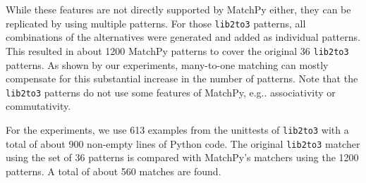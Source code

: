 \documentclass[conference,compsoc]{IEEEtran}
\makeatletter
\DeclareRobustCommand\onedot{\futurelet\@let@token\@onedot}
\def\@onedot{\ifx\@let@token.\else.\null\fi\xspace}
\def\eg{{e.g}\onedot} \def\Eg{{E.g}\onedot}
\newif\ifminted
\makeatother
\begin{document}
\ifminted
The following is an example of such a pattern:
\begin{verbatim}
power< 'isinstance'
    trailer< '(' arglist< any ','
        atom< '('
            args=testlist_gexp< any+ >
')' > > ')' > >
\end{verbatim}

It matches an \texttt{isinstance} expression with a tuple as second argument.
Its tree structure is illustrated in Figure \ref{fig:ast}.
The corresponding fixer cleans up duplications generated by previous fixers.
For example, \texttt{isinstance(x, (int, long))}
would be converted by another fixer into \texttt{isinstance(x, (int, int))}
which in turn is then simplified to \texttt{isinstance(x, int)} by this fixer.
\begin{figure}[]\noindent\makebox[\columnwidth][c]{\texttt{[image: ast.pdf]}}
\caption{AST of the \texttt{isinstance} pattern. \label{fig:ast}}
\end{figure}

Out of the original 46 patterns, 36 could be converted to MatchPy patterns.
Some patterns could not be converted because they contain features that MatchPy does not support yet.
Those features include negated subpatterns (\eg \texttt{not atom<'(' [any] ')'>})
and subpatterns that allow an arbitrary number of repetitions (\eg \texttt{any (',' any)+}).

Furthermore, some of the AST patterns contain alternative or optional subpatterns, \eg \texttt{power<'input' args=trailer<'(' [any] ')'>>}. \fi
While these features are not directly supported by MatchPy either, they can be replicated by using multiple patterns.
For those \texttt{lib2to3} patterns, all combinations of the alternatives were generated and added as individual patterns.
This resulted in about 1200 MatchPy patterns to cover the original 36 \texttt{lib2to3} patterns.
As shown by our experiments, many-to-one matching can mostly compensate for this substantial increase in the number of patterns.
Note that the \texttt{lib2to3} patterns do not use some features of MatchPy, \eg associativity or commutativity.

For the experiments, we use 613 examples from the unittests of \texttt{lib2to3} with a total of about 900 non-empty lines of Python code.
The original \texttt{lib2to3} matcher using the set of 36 patterns is compared with MatchPy's matchers using the 1200 patterns.
A total of about 560 matches are found.
\end{document}
